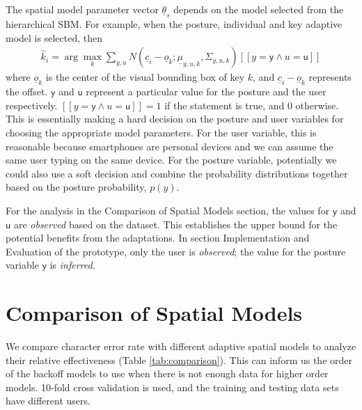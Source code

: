 \documentclass{sigchi}
\begin{document}
The spatial model parameter vector $\underline \theta_s$ depends on the model selected from the hierarchical SBM. For example, when the posture, individual and key adaptive model is selected, then
\begin{align}          
\hat k_i = \arg\max_k \sum_{y, u} N(\underline c_i - \underline o_k; \underline\mu_{y,u,k}, \Sigma_{y,u,k})[[y = \textsf{y} \wedge u = \textsf{u}]]
\end{align}
where $\underline o_k$ is the center of the visual bounding box of key $k$, and $\underline c_i - \underline o_k$ 
represents the offset. $\textsf{y}$ and $\textsf{u}$ represent a particular value for the posture 
and the user respectively. $[[y = \textsf{y} \wedge u = \textsf{u}]] = 1$ if the 
statement is true, and $0$ otherwise. This is essentially making a hard decision on the 
posture and user variables for choosing the appropriate model parameters. For the user variable, 
this is reasonable because smartphones are personal devices and we can assume the 
same user typing on the same device. For the posture variable, potentially we could also 
use a soft decision and combine the probability distributions together based on the posture probability, $p(y)$. 

For the analysis in the Comparison of Spatial Models section, the values for $\textsf{y}$ and $\textsf{u}$ are 
\textit{observed} based on the dataset. This establishes the upper bound for the potential benefits from the adaptations. In section Implementation and Evaluation of the prototype, only the user is \textit{observed}; the value for the posture variable $\textsf{y}$ is \textit{inferred}.

\section{Comparison of Spatial Models}
We compare character error rate with different adaptive spatial models to analyze their
relative effectiveness (Table \ref{tab:comparison}). This can inform us the order of the
backoff models to use when there is not enough data for higher order models.
10-fold cross validation is used, and the training and testing data sets have different users.
\end{document}

